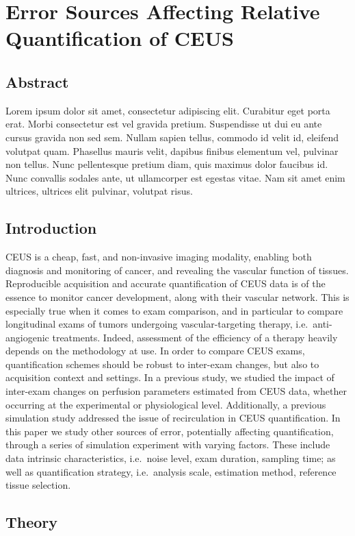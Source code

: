 \chapter{Error Sources Affecting Relative Quantification of CEUS} 

\section{Abstract}
Lorem ipsum dolor sit amet, consectetur adipiscing elit. Curabitur eget porta erat. Morbi consectetur est vel gravida pretium. Suspendisse ut dui eu ante cursus gravida non sed sem. Nullam sapien tellus, commodo id velit id, eleifend volutpat quam. Phasellus mauris velit, dapibus finibus elementum vel, pulvinar non tellus. Nunc pellentesque pretium diam, quis maximus dolor faucibus id. Nunc convallis sodales ante, ut ullamcorper est egestas vitae. Nam sit amet enim ultrices, ultrices elit pulvinar, volutpat risus.

\section{Introduction}
CEUS is a cheap, fast, and non-invasive imaging modality, enabling both diagnosis and monitoring of cancer, and revealing the vascular function of tissues.
Reproducible acquisition and accurate quantification of CEUS data is of the essence to monitor cancer development, along with their vascular network.
This is especially true when it comes to exam comparison, and in particular to compare longitudinal exams of tumors undergoing vascular-targeting therapy, i.e.~anti-angiogenic treatments. 
Indeed, assessment of the efficiency of a therapy heavily depends on the methodology at use.
In order to compare CEUS exams, quantification schemes should be robust to inter-exam changes, but also to acquisition context and settings.
In a previous study, we studied the impact of inter-exam changes on perfusion parameters estimated from CEUS data, whether occurring at the experimental or physiological level.
Additionally, a previous simulation study addressed the issue of recirculation in CEUS quantification.
In this paper we study other sources of error, potentially affecting quantification, through a series of simulation experiment with varying factors.
These include data intrinsic characteristics, i.e.~noise level, exam duration, sampling time; as well as quantification strategy, i.e.~analysis scale, estimation method, reference tissue selection.

\section{Theory}
